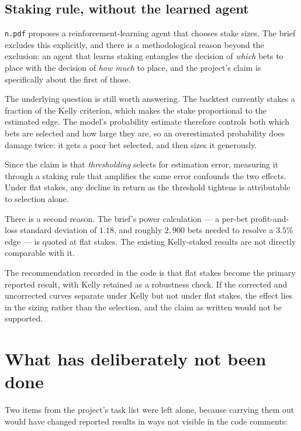 \documentclass[11pt,a4paper]{article}
\newcommand{\code}[1]{\texttt{#1}}
\begin{document}
\subsection{Staking rule, without the learned agent}

\code{n.pdf} proposes a reinforcement-learning agent that chooses stake sizes.
The brief excludes this explicitly, and there is a methodological reason
beyond the exclusion: an agent that learns staking entangles the decision of
\emph{which} bets to place with the decision of \emph{how much} to place, and
the project's claim is specifically about the first of those.

The underlying question is still worth answering. The backtest currently
stakes a fraction of the Kelly criterion, which makes the stake proportional
to the estimated edge. The model's probability estimate therefore controls
both which bets are selected and how large they are, so an overestimated
probability does damage twice: it gets a poor bet selected, and then sizes it
generously.

Since the claim is that \emph{thresholding} selects for estimation error,
measuring it through a staking rule that amplifies the same error confounds
the two effects. Under flat stakes, any decline in return as the threshold
tightens is attributable to selection alone.

There is a second reason. The brief's power calculation --- a per-bet
profit-and-loss standard deviation of $1.18$, and roughly $2{,}900$ bets
needed to resolve a $3.5\%$ edge --- is quoted at flat stakes. The existing
Kelly-staked results are not directly comparable with it.

The recommendation recorded in the code is that flat stakes become the primary
reported result, with Kelly retained as a robustness check. If the corrected
and uncorrected curves separate under Kelly but not under flat stakes, the
effect lies in the sizing rather than the selection, and the claim as written
would not be supported.

\section{What has deliberately not been done}

Two items from the project's task list were left alone, because carrying them
out would have changed reported results in ways not visible in the code
comments:
\end{document}
